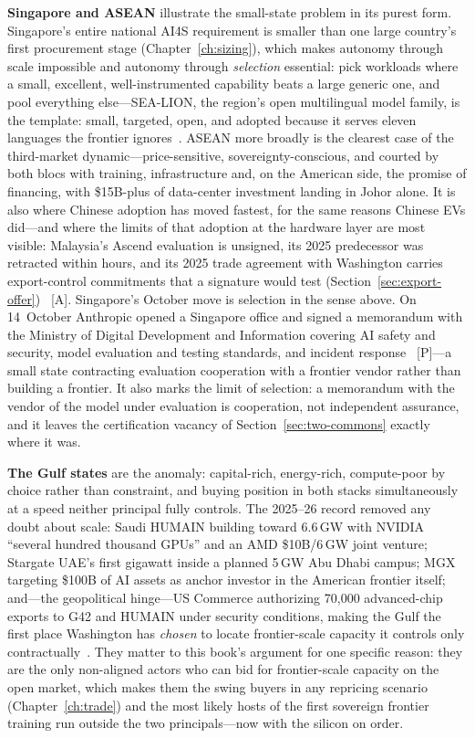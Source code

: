 \textbf{Singapore and ASEAN} illustrate the small-state problem in its purest form. Singapore's entire national AI4S requirement is smaller than one large country's first procurement stage (Chapter~\ref{ch:sizing}), which makes autonomy through scale impossible and autonomy through \emph{selection} essential: pick workloads where a small, excellent, well-instrumented capability beats a large generic one, and pool everything else---SEA-LION, the region's open multilingual model family, is the template: small, targeted, open, and adopted because it serves eleven languages the frontier ignores~\cite{sea-lion}. ASEAN more broadly is the clearest case of the third-market dynamic---price-sensitive, sovereignty-conscious, and courted by both blocs with training, infrastructure and, on the American side, the promise of financing, with \$15B-plus of data-center investment landing in Johor alone. It is also where Chinese adoption has moved fastest, for the same reasons Chinese EVs did---and where the limits of that adoption at the hardware layer are most visible: Malaysia's Ascend evaluation is unsigned, its 2025 predecessor was retracted within hours, and its 2025 trade agreement with Washington carries export-control commitments that a signature would test (Section~\ref{sec:export-offer})~\cite{huawei-malaysia} [A]. Singapore's October move is selection in the sense above. On 14~October Anthropic opened a Singapore office and signed a memorandum with the Ministry of Digital Development and Information covering AI safety and security, model evaluation and testing standards, and incident response~\cite{gov-anthropic-singapore} [P]---a small state contracting evaluation cooperation with a frontier vendor rather than building a frontier. It also marks the limit of selection: a memorandum with the vendor of the model under evaluation is cooperation, not independent assurance, and it leaves the certification vacancy of Section~\ref{sec:two-commons} exactly where it was.

\textbf{The Gulf states} are the anomaly: capital-rich, energy-rich, compute-poor by choice rather than constraint, and buying position in both stacks simultaneously at a speed neither principal fully controls. The 2025--26 record removed any doubt about scale: Saudi HUMAIN building toward 6.6\,GW with NVIDIA ``several hundred thousand GPUs'' and an AMD \$10B/6\,GW joint venture; Stargate UAE's first gigawatt inside a planned 5\,GW Abu Dhabi campus; MGX targeting \$100B of AI assets as anchor investor in the American frontier itself; and---the geopolitical hinge---US Commerce authorizing 70{,}000 advanced-chip exports to G42 and HUMAIN under security conditions, making the Gulf the first place Washington has \emph{chosen} to locate frontier-scale capacity it controls only contractually~\cite{gulf-ai}. They matter to this book's argument for one specific reason: they are the only non-aligned actors who can bid for frontier-scale capacity on the open market, which makes them the swing buyers in any repricing scenario (Chapter~\ref{ch:trade}) and the most likely hosts of the first sovereign frontier training run outside the two principals---now with the silicon on order.

